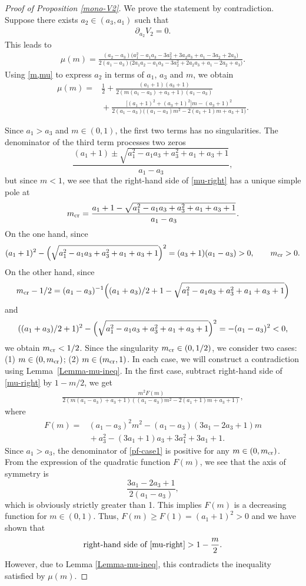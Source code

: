 \documentclass[10pt,a4paper]{amsart}
\numberwithin{equation}{section}
\begin{document}
\begin{proof}[Proof of Proposition \ref{mono-V2}]
We prove the statement by contradiction. Suppose there exists $a_2\in (a_3,a_1)$ such that
\begin{align*}
\partial_{a_2}V_2=0.
\end{align*}
This leads to
\begin{align*}
\mu(m)=\frac{(a_2-a_3)\bigl(a_1^2-a_1a_3-3a_2^2+3a_2a_3+a_1-3a_2+2a_3\bigr)}{2(a_1-a_3)\bigl(2a_1a_2-a_1a_3-3a_2^2+2a_2a_3+a_1-2a_2+a_3\bigr)}.
\end{align*}
Using \eqref{m,mu} to express
$a_2$ in terms of $a_1$, $a_3$ and $m$, we obtain
\begin{align}
\mu(m)={}&\frac{1}{2}+\frac{(a_1+1)(a_3+1)}{2(m(a_1-a_3)+a_3+1)(a_1-a_3)}\nonumber\\
&{}+\frac{\bigl[(a_1+1)^2+(a_3+1)^2\bigr]m-(a_3+1)^2}{2(a_1-a_3)\bigl((a_1-a_3)m^2-2(a_1+1)m+a_3+1\bigr)}.\label{mu-right}
\end{align}

Since $a_1>a_3$ and $m\in (0,1)$, the first two terms has no singularities. The denominator of the third term processes two zeros
\[\frac{(a_1+1)\pm\sqrt{a_1^2-a_1a_3+a_3^2+a_1+a_3+1}}{a_1-a_3},\]
but since $m<1$, we see that the right-hand side of \eqref{mu-right} has a unique simple pole at
\begin{align*}
m_{\rm cr}=\frac{a_1+1-\sqrt{a_1^2-a_1a_3+a_3^2+a_1+a_3+1}}{a_1-a_3}.
\end{align*}
On the one hand, since
\[
(a_1+1)^2-\Bigl(\sqrt{a_1^2-a_1a_3+a_3^2+a_1+a_3+1}\Bigr)^2=(a_3+1)(a_1-a_3)>0, \qquad m_{\rm cr}>0.
\]
 On the other hand, since
 \[
 m_{\rm cr}-1/2=(a_1-a_3)^{-1}\Bigl((a_1+a_3)/2+1-\sqrt{a_1^2-a_1a_3+a_3^2+a_1+a_3+1}\Bigr)
 \]
 and
 \[
 ((a_1+a_3)/2+1)^2-\Bigl(\sqrt{a_1^2-a_1a_3+a_3^2+a_1+a_3+1}\Bigr)^2=-(a_1-a_3)^2<0,
\]
we obtain $m_{\rm cr}<1/2$. Since the singularity $m_{\rm cr}\in (0,1/2)$, we consider two cases: (1) $m\in (0,m_{\rm cr})$; (2) $m\in (m_{\rm cr},1)$. In each case, we will construct a contradiction using Lemma~\ref{Lemma-mu-ineq}.
In the first case, subtract right-hand side of \eqref{mu-right} by $1-m/2$, we get
\begin{align}
\frac{m^2 F(m)}{2(m(a_1-a_3)+a_3+1)((a_1-a_3)m^2-2(a_1+1)m+a_3+1)},\label{pf-case1}
\end{align}
where
\begin{align*}
F(m)={}&(a_1-a_3)^2m^2-(a_1-a_3)(3a_1-2a_3+1)m\\
&{}+a_3^2-(3a_1+1)a_3+3a_1^2+3a_1+1.
\end{align*}
Since $a_1>a_3$, the denominator of \eqref{pf-case1} is positive for any $m\in (0,m_{\rm cr})$. From the expression of the quadratic function $F(m)$, we see that the axis of symmetry is
\[\frac{3a_1-2a_3+1}{2(a_1-a_3)},\]
which is obviously strictly greater than 1. This implies $F(m)$ is a decreasing function for $m\in (0,1)$. Thus, $F(m)\geq F(1)=(a_1+1)^2>0$ and we have shown that
\begin{align*}
\text{right-hand side of \eqref{mu-right}}>1-\frac{m}{2}.
\end{align*}
However, due to Lemma \ref{Lemma-mu-ineq}, this contradicts the inequality satisfied by $\mu(m)$.


\end{proof}
\end{document}
